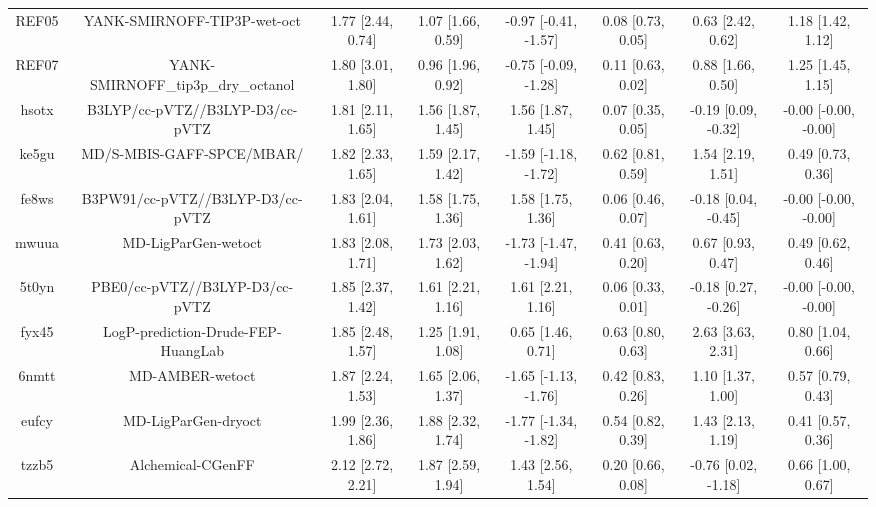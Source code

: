 \documentclass{article}
\begin{document}
\begin{center}
\begin{longtable}{|cccccccc|}
 REF05 &                        YANK-SMIRNOFF-TIP3P-wet-oct &  1.77 [2.44, 0.74] &  1.07 [1.66, 0.59] &  -0.97 [-0.41, -1.57] &  0.08 [0.73, 0.05] &     0.63 [2.42, 0.62] &     1.18 [1.42, 1.12] \\
 REF07 &                 YANK-SMIRNOFF\_tip3p\_dry\_octanol &  1.80 [3.01, 1.80] &  0.96 [1.96, 0.92] &  -0.75 [-0.09, -1.28] &  0.11 [0.63, 0.02] &     0.88 [1.66, 0.50] &     1.25 [1.45, 1.15] \\
 hsotx &                    B3LYP/cc-pVTZ//B3LYP-D3/cc-pVTZ &  1.81 [2.11, 1.65] &  1.56 [1.87, 1.45] &     1.56 [1.87, 1.45] &  0.07 [0.35, 0.05] &   -0.19 [0.09, -0.32] &  -0.00 [-0.00, -0.00] \\
 ke5gu &                          MD/S-MBIS-GAFF-SPCE/MBAR/ &  1.82 [2.33, 1.65] &  1.59 [2.17, 1.42] &  -1.59 [-1.18, -1.72] &  0.62 [0.81, 0.59] &     1.54 [2.19, 1.51] &     0.49 [0.73, 0.36] \\
 fe8ws &                   B3PW91/cc-pVTZ//B3LYP-D3/cc-pVTZ &  1.83 [2.04, 1.61] &  1.58 [1.75, 1.36] &     1.58 [1.75, 1.36] &  0.06 [0.46, 0.07] &   -0.18 [0.04, -0.45] &  -0.00 [-0.00, -0.00] \\
 mwuua &                                MD-LigParGen-wetoct &  1.83 [2.08, 1.71] &  1.73 [2.03, 1.62] &  -1.73 [-1.47, -1.94] &  0.41 [0.63, 0.20] &     0.67 [0.93, 0.47] &     0.49 [0.62, 0.46] \\
 5t0yn &                     PBE0/cc-pVTZ//B3LYP-D3/cc-pVTZ &  1.85 [2.37, 1.42] &  1.61 [2.21, 1.16] &     1.61 [2.21, 1.16] &  0.06 [0.33, 0.01] &   -0.18 [0.27, -0.26] &  -0.00 [-0.00, -0.00] \\
 fyx45 &                 LogP-prediction-Drude-FEP-HuangLab &  1.85 [2.48, 1.57] &  1.25 [1.91, 1.08] &     0.65 [1.46, 0.71] &  0.63 [0.80, 0.63] &     2.63 [3.63, 2.31] &     0.80 [1.04, 0.66] \\
 6nmtt &                                    MD-AMBER-wetoct &  1.87 [2.24, 1.53] &  1.65 [2.06, 1.37] &  -1.65 [-1.13, -1.76] &  0.42 [0.83, 0.26] &     1.10 [1.37, 1.00] &     0.57 [0.79, 0.43] \\
 eufcy &                                MD-LigParGen-dryoct &  1.99 [2.36, 1.86] &  1.88 [2.32, 1.74] &  -1.77 [-1.34, -1.82] &  0.54 [0.82, 0.39] &     1.43 [2.13, 1.19] &     0.41 [0.57, 0.36] \\
 tzzb5 &                                  Alchemical-CGenFF &  2.12 [2.72, 2.21] &  1.87 [2.59, 1.94] &     1.43 [2.56, 1.54] &  0.20 [0.66, 0.08] &   -0.76 [0.02, -1.18] &     0.66 [1.00, 0.67] \\

\end{longtable}
\end{center}
\end{document}
